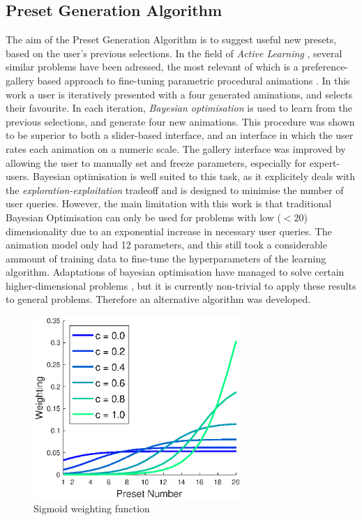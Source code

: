 \documentclass[11pt, oneside]{report}   	%
\begin{document}
\subsection{Preset Generation Algorithm} \label{sec:PresetGeneration}
The aim of the Preset Generation Algorithm is to suggest useful new presets, based on the user's previous selections. In the field of \emph{Active Learning} \cite{ActiveLearning}, several similar problems have been adressed, the most relevant of which is a preference-gallery based approach to fine-tuning parametric procedural animations \cite{PreferenceGallery}.
In this work a user is iteratively presented with a four generated aminations, and selects their favourite. In each iteration, \emph{Bayesian optimisation} is used to learn from the previous selections, and generate four new animations. This procedure was shown to be superior to both a slider-based interface, and an interface in which the user rates each animation on a numeric scale. The gallery interface was improved by allowing the user to manually set and freeze parameters, especially for expert-users. Bayesian optimisation is well suited to this task, as it explicitely deals with the \emph{exploration-exploitation} tradeoff \cite{ExplorationExploitation} and is designed to minimise the number of user queries. However, the main limitation with this work is that traditional Bayesian Optimisation can only be used for problems with low ($<20$) dimensionality due to an exponential increase in necessary user queries. The animation model only had 12 parameters, and this still took a considerable ammount of training data to fine-tune the hyperparameters of the learning algorithm.  Adaptations of bayesian optimisation have managed to solve certain higher-dimensional problems \cite{BayesOptDimensionality}, but it is currently non-trivial to apply these results to general problems. Therefore an alternative algorithm was developed.
\begin{figure}
	\vspace{-30pt}
	\hspace{-31pt}
	\includegraphics[width = 3.1in]{SigmoidWeights.eps}
	\caption{Sigmoid weighting function}
	\label{fig:SigmoidWeights}
	
	
	\vspace{40pt}
\end{figure}
\end{document}
